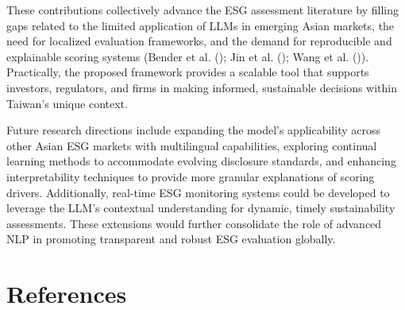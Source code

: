 \documentclass[
  12pt,
]{article}
\begin{document}
These contributions collectively advance the ESG assessment literature
by filling gaps related to the limited application of LLMs in emerging
Asian markets, the need for localized evaluation frameworks, and the
demand for reproducible and explainable scoring systems (Bender et al.
(); Jin et al.
(); Wang et al.
()). Practically, the proposed framework
provides a scalable tool that supports investors, regulators, and firms
in making informed, sustainable decisions within Taiwan's unique
context.

Future research directions include expanding the model's applicability
across other Asian ESG markets with multilingual capabilities, exploring
continual learning methods to accommodate evolving disclosure standards,
and enhancing interpretability techniques to provide more granular
explanations of scoring drivers. Additionally, real-time ESG monitoring
systems could be developed to leverage the LLM's contextual
understanding for dynamic, timely sustainability assessments. These
extensions would further consolidate the role of advanced NLP in
promoting transparent and robust ESG evaluation globally.

\section*{References}\label{references}
\end{document}
